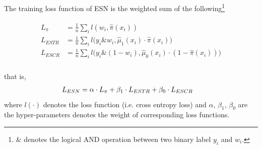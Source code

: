 \documentclass[sigconf]{acmart}
\begin{document}
The training loss function of ESN is the weighted sum of the following\footnote{\& denotes the logical AND operation between two binary label $y_i$ and $w_i$.}

\begin{align}
    \label{Loss ESN}
    \begin{aligned}
    L_{\pi} &= \frac{1}{n} \sum_{i}l(w_i, \hat\pi(x_i)) \\
    L_{ESTR} &= \frac{1}{n} \sum_{i}l\big(y_i\&w_i, \hat\mu_1(x_i) \cdot \hat\pi(x_i)\big) \\
    L_{ESCR} &= \frac{1}{n} \sum_{i}l\big(y_i\&(1-w_i), \hat\mu_0(x_i) \cdot (1-\hat\pi(x_i))\big) \\
    \end{aligned}
\end{align}

\vspace{0.6cm}
that is,
\begin{align}
    \begin{aligned}
    L_{ESN} &= \alpha \cdot L_{\pi} + \beta_1 \cdot L_{ESTR} + \beta_0 \cdot L_{ESCR}
    \end{aligned}
    \vspace{-0.3cm}
\end{align}
where $l(\cdot)$ denotes the loss function (i.e. cross entropy loss) and $\alpha$, $\beta_1$, $\beta_0$ are the hyper-parameters denotes the weight of corresponding loss functions.

\begin{table}[t]
    \centering
    \vspace{0.1cm}
    \caption{Statistics of the synthetic dataset \textit{Epilesy} and real-world Production Dataset.}
    \vspace{-0.6cm}
    \label{table:dataset}
\end{table}
\end{document}
